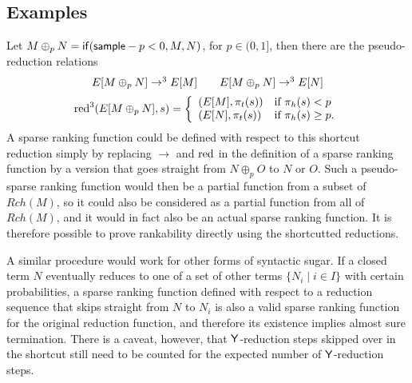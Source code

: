 \subsection{Examples}
Let $M \oplus_p N = \mathsf{if}(\mathsf{sample} - p < 0, M, N)$, for $p \in (0,1]$, then there are the pseudo-reduction relations
\[
\begin{array}{c}
E[M \oplus_p N] \to^3  E[M] \qquad
E[M \oplus_p N] \to^3  E[N] \\[2mm]
\operatorname{red}^3(E[M \oplus_p N], s) = \left\{
    \begin{array}{ll}
        (E[M],\pi_t(s)) & \text{if } \pi_h(s) < p \\
        (E[N],\pi_t(s)) & \text{if } \pi_h(s) \geq p. 
    \end{array} \right .
\end{array}
\]
A sparse ranking function could be defined with respect to this shortcut reduction simply by replacing $\to$ and $\operatorname{red}$ in the definition of a sparse ranking function by a version that goes straight from $N \oplus_p O$ to $N$ or $O$. Such a pseudo-sparse ranking function would then be a partial function from a subset of $Rch(M)$, so it could also be considered as a partial function from all of $Rch(M)$, and it would in fact also be an actual sparse ranking function. It is therefore possible to prove rankability directly using the shortcutted reductions.

A similar procedure would work for other forms of syntactic sugar. If a closed term $N$ eventually reduces to one of a set of other terms $\{N_i \mid i \in I\}$ with certain probabilities, a sparse ranking function defined with respect to a reduction sequence that skips straight from $N$ to $N_i$ is also a valid sparse ranking function for the original reduction function, and therefore its existence implies almost sure termination. There is a caveat, however, that $\mathsf{Y}$-reduction steps skipped over in the shortcut still need to be counted for the expected number of $\mathsf{Y}$-reduction steps.

